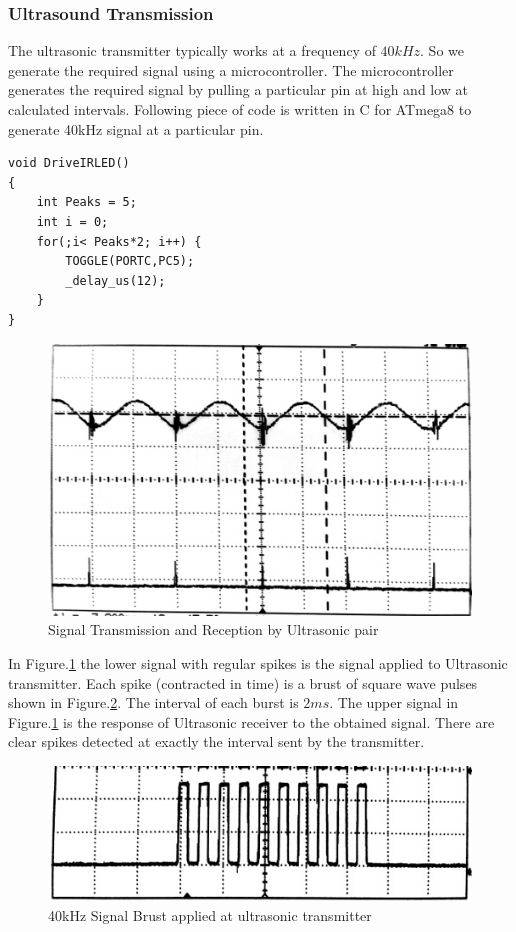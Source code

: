 \subsubsection{Ultrasound Transmission}
The ultrasonic transmitter typically works at a frequency of $40kHz$. So we generate the required signal using  a microcontroller. The microcontroller generates the required signal by pulling a particular pin at high and low at calculated intervals. Following piece of code is written in C for ATmega8 to generate 40kHz signal at a particular pin.

\begin{lstlisting}
void DriveIRLED()
{
	int Peaks = 5;
	int i = 0;
	for(;i< Peaks*2; i++) {
		TOGGLE(PORTC,PC5);
		_delay_us(12);
	}
}
\end{lstlisting}

\begin{figure}
	\centering
	\includegraphics[width=120mm]{Images/UltrasonicTransception.jpg}
	\caption{Signal Transmission and Reception by Ultrasonic pair}
	\label{fig:UltrasonicTransception}
\end{figure}
In Figure.\ref{fig:UltrasonicTransception} the lower signal with regular spikes is the signal applied to Ultrasonic transmitter. Each spike (contracted in time) is a brust of square wave pulses shown in Figure.\ref{fig:SignalBrust}. The interval of each burst is $2ms$. The upper signal in Figure.\ref{fig:UltrasonicTransception} is the response of Ultrasonic receiver to the obtained signal. There are clear spikes  detected at exactly the interval sent by the transmitter.
\begin{figure}
	\centering
	\includegraphics[width=120mm]{Images/SignalBrust.jpg}
	\caption{40kHz Signal Brust applied at ultrasonic transmitter}
	\label{fig:SignalBrust}
\end{figure}
 
